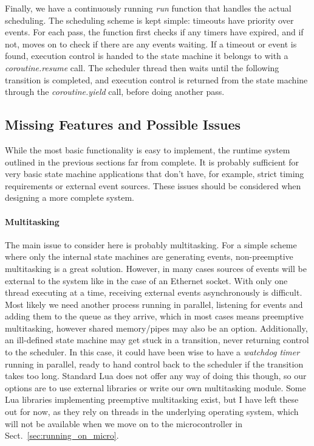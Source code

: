 Finally, we have a continuously running \emph{run} function that handles the actual scheduling. The scheduling scheme is kept simple: timeouts have priority over events. For each pass, the function first checks if any timers have expired, and if not, moves on to check if there are any events waiting. If a timeout or event is found, execution control is handed to the state machine it belongs to with a \emph{coroutine.resume} call. The scheduler thread then waits until the following transition is completed, and execution control is returned from the state machine through the \emph{coroutine.yield} call, before doing another pass.

\subsection{Missing Features and Possible Issues}
\label{sec:runtime_system_issues}
While the most basic functionality is easy to implement, the runtime system outlined in the previous sections far from complete. It is probably sufficient for very basic state machine applications that don't have, for example, strict timing requirements or external event sources. These issues should be considered when designing a more complete system.

\paragraph{Multitasking} The main issue to consider here is probably multitasking. For a simple scheme where only the internal state machines are generating events, non-preemptive multitasking is a great solution. However, in many cases sources of events will be external to the system like in the case of an Ethernet socket. With only one thread executing at a time, receiving external events asynchronously is difficult. Most likely we need another process running in parallel, listening for events and adding them to the queue as they arrive, which in most cases means preemptive multitasking, however shared memory/pipes may also be an option. Additionally, an ill-defined state machine may get stuck in a transition, never returning control to the scheduler. In this case, it could have been wise to have a \emph{watchdog timer} running in parallel, ready to hand control back to the scheduler if the transition takes too long. Standard Lua does not offer any way of doing this though, so our options are to use external libraries or write our own multitasking module. Some Lua libraries implementing preemptive multitasking exist, but I have left these out for now, as they rely on threads in the underlying operating system, which will not be available when we move on to the microcontroller in Sect.~\ref{sec:running_on_micro}.

